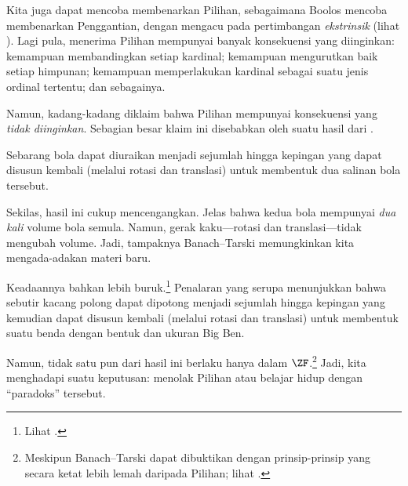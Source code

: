 \documentclass[../../../include/open-logic-section]{subfiles}
\begin{document}

Kita juga dapat mencoba membenarkan Pilihan, sebagaimana Boolos mencoba
membenarkan Penggantian, dengan mengacu pada pertimbangan
\emph{ekstrinsik} (lihat ). Lagi pula,
menerima Pilihan mempunyai banyak konsekuensi yang diinginkan: kemampuan
membandingkan setiap kardinal; kemampuan mengurutkan baik setiap himpunan;
kemampuan memperlakukan kardinal sebagai suatu jenis ordinal tertentu; dan
sebagainya.

Namun, kadang-kadang diklaim bahwa Pilihan mempunyai konsekuensi yang
\emph{tidak diinginkan}. Sebagian besar klaim ini disebabkan oleh suatu
hasil dari \cite{BanachTarski1924}.

\begin{thm}
Sebarang bola dapat diuraikan menjadi sejumlah hingga kepingan yang dapat
disusun kembali (melalui rotasi dan translasi) untuk membentuk dua salinan
bola tersebut.
\end{thm}
\noindent
Sekilas, hasil ini cukup mencengangkan. Jelas bahwa kedua bola mempunyai
\emph{dua kali} volume bola semula. Namun, gerak kaku---rotasi dan
translasi---tidak mengubah volume. Jadi, tampaknya Banach--Tarski
memungkinkan kita mengada-adakan materi baru.

Keadaannya bahkan lebih buruk.\footnote{Lihat
\citet[Teorema 3.12]{Wagon2016}.} Penalaran yang serupa menunjukkan bahwa
sebutir kacang polong dapat dipotong menjadi sejumlah hingga kepingan yang
kemudian dapat disusun kembali (melalui rotasi dan translasi) untuk membentuk
suatu benda dengan bentuk dan ukuran Big Ben.

Namun, tidak satu pun dari hasil ini berlaku hanya dalam $\ZF$.\footnote{
Meskipun Banach--Tarski dapat dibuktikan dengan prinsip-prinsip yang secara
ketat lebih lemah daripada Pilihan; lihat \citet[hlm.~303]{Wagon2016}.}
Jadi, kita menghadapi suatu keputusan: menolak Pilihan atau belajar hidup
dengan ``paradoks'' tersebut.
\end{document}
